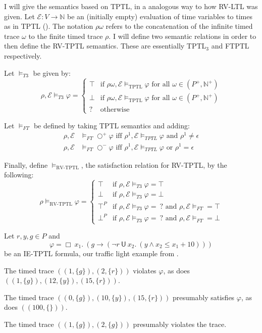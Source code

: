 \documentclass[a4paper]{article}
\newcommand{\U}{\mathsf{U}}
\newcommand{\tand}{\text{ and }}
\newcommand{\tor}{\text{ or }}
\newcommand{\tiff}{\text{ iff }}
\newcommand{\fall}{\text{ for all }}
\newcommand{\sn}{\bigcirc^+}
\newcommand{\wn}{\bigcirc^-}
\newcommand{\eval}{\mathcal{E}}
\begin{document}
\begin{defn}\label{rvtptlsem}

  I will give the semantics based on TPTL, in a analogous way to how RV-LTL was given.
  Let $\eval:V\to\mathbb{N}$ be an (initially empty) evaluation of time variables to times as in TPTL ().
  The notation $\rho\omega$ refers to the concatenation of the infinite timed trace $\omega$ to the finite timed trace $\rho$.
  I will define two semantic relations in order to then define the RV-TPTL semantics. These are essentially TPTL$_3$ and FTPTL respectively.

  Let $\vDash_{T3}$ be given by:
  \[\rho,\eval\vDash_{T3}\varphi = \begin{cases}
    \top & \text{if } \rho\omega,\eval \vDash_{\text{TPTL}} \varphi \fall \omega \in (P^+,\mathbb{N}^+)\\
    \bot & \text{if }  \rho\omega,\eval \vDash_{\text{TPTL}} \varphi \fall \omega \in (P^+,\mathbb{N}^+)\\
      ? & \text{otherwise}
    \end{cases}
  \]

  Let $\vDash_{FT}$ be defined by taking TPTL semantics and adding:
  \begin{align*}\label{ftsem}
    \rho,\eval&\vDash_{FT}\sn\varphi \tiff \rho^1,\eval\vDash_{TPTL}\varphi \tand \rho^1 \neq \epsilon\\
    \rho,\eval&\vDash_{FT}\wn\varphi \tiff \rho^1,\eval\vDash_{TPTL}\varphi \tor \rho^1 = \epsilon
  \end{align*}

  Finally, define $\vDash_{\text{RV-TPTL}}$, the satisfaction relation for RV-TPTL, by the following:
  \[\rho\vDash_{\text{RV-TPTL}}\varphi =
    \begin{cases}
      \top & \text{if } \rho,\eval\vDash_{T3} \varphi = \top\\
      \bot & \text{if } \rho,\eval \vDash_{T3} \varphi = \bot\\
      \top^P & \text{if } \rho,\eval \vDash_{T3} \varphi = ~?\tand \rho,\eval\vDash_{FT} = \top \\
      \bot^P & \text{if } \rho,\eval \vDash_{T3} \varphi = ~?\tand \rho,\eval\vDash_{FT} = \bot
    \end{cases}
  \]
\end{defn}

\begin{eg}
  Let $r,y,g\in P$ and \[\varphi = \Box ~x_1.~ (g \to (\neg r ~\U~ x_2.~ (y \land x_2 \leq x_1 + 10) ))\] be an IE-TPTL formula, our traffic light example from .

  The timed trace $((1,\{g\}),(2,\{r\}))$ violates $\varphi$,
  as does $((1,\{g\}),(12,\{y\}),(15,\{r\}))$.

  The timed trace $((0,\{g\}),(10,\{y\}),(15,\{r\}))$ presumably satisfies $\varphi$, as does $((100,\{\}))$.

  The timed trace $((1,\{g\}),(2,\{g\}))$ presumably violates the trace.
\end{eg}
\end{document}
